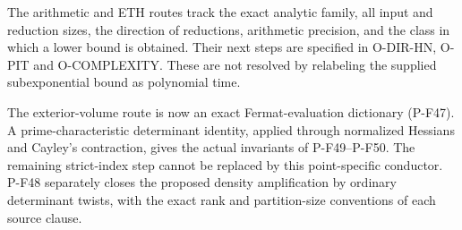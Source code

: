 The arithmetic and ETH routes track the exact analytic family, all input
and reduction sizes, the direction of reductions, arithmetic precision,
and the class in which a lower bound is obtained. Their next steps are
specified in O-DIR-HN, O-PIT and O-COMPLEXITY. These are not resolved by
relabeling the supplied subexponential bound as polynomial time.

The exterior-volume route is now an exact Fermat-evaluation
dictionary (P-F47). A prime-characteristic determinant identity,
applied through normalized Hessians and Cayley's contraction,
gives the actual invariants of P-F49--P-F50. The remaining
strict-index step cannot be replaced by this point-specific
conductor. P-F48 separately closes the proposed density
amplification by ordinary determinant twists, with the exact
rank and partition-size conventions of each source clause.
